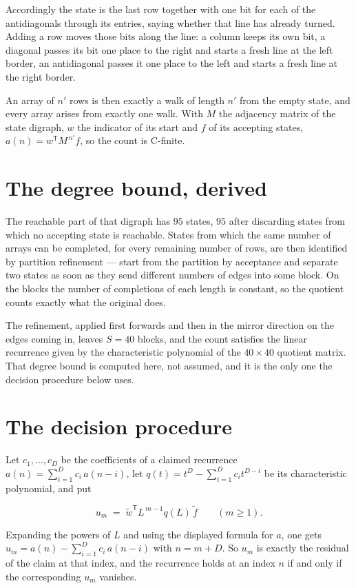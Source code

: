 \documentclass[11pt]{article}
\theoremstyle{definition}
\begin{document}
Accordingly the state is the last row together with one bit for each of the antidiagonals through its entries, saying whether that line has already turned. Adding a row moves those bits along the line: a column keeps its own bit, a diagonal passes its bit one place to the right and starts a fresh line at the left border, an antidiagonal passes it one place to the left and starts a fresh line at the right border.

An array of $n'$ rows is then exactly a walk of length $n'$ from the empty state, and every array arises from exactly one walk. With $M$ the adjacency matrix of the state digraph, $w$ the indicator of its start and $f$ of its accepting states, $a(n) = w^{\mathsf T}M^{\,n'}f$, so the count is C-finite.

\section{The degree bound, derived}

The reachable part of that digraph has $95$ states, $95$ after discarding states from which no accepting state is reachable. States from which the same number of arrays can be completed, for every remaining number of rows, are then identified by partition refinement --- start from the partition by acceptance and separate two states as soon as they send different numbers of edges into some block. On the blocks the number of completions of each length is constant, so the quotient counts exactly what the original does.

The refinement, applied first forwards and then in the mirror direction on the edges coming in, leaves $S = 40$ blocks, and the count satisfies the linear recurrence given by the characteristic polynomial of the $40 \times 40$ quotient matrix. That degree bound is computed here, not assumed, and it is the only one the decision procedure below uses.

\section{The decision procedure}

Let $c_1,\dots,c_D$ be the coefficients of a claimed recurrence $a(n) = \sum_{i=1}^{D} c_i\,a(n-i)$, let $q(t) = t^{D} - \sum_{i=1}^{D} c_i t^{D-i}$ be its characteristic polynomial, and put

\[u_m \;=\; \tilde w^{\mathsf T} L^{\,m-1} q(L)\,\tilde f \qquad (m \ge 1).\]

Expanding the powers of $L$ and using the displayed formula for $a$, one gets $u_m = a(n) - \sum_{i=1}^{D} c_i\,a(n-i)$ with $n = m + D$. So $u_m$ is exactly the residual of the claim at that index, and the recurrence holds at an index $n$ if and only if the corresponding $u_m$ vanishes.
\end{document}
